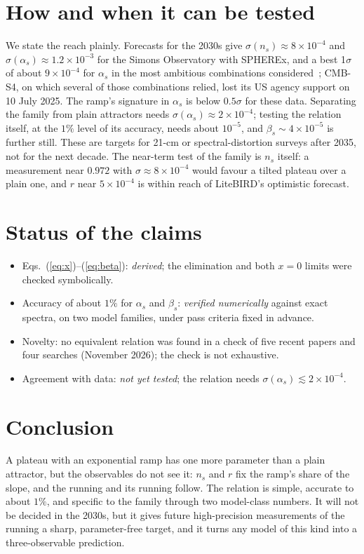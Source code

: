\documentclass[aps,prd,twocolumn,superscriptaddress,nofootinbib,showkeys]{revtex4-2}
\begin{document}
\section{How and when it can be tested}
We state the reach plainly. Forecasts for the 2030s give $\sigma(n_s)\approx8\times10^{-4}$ and $\sigma(\alpha_s)\approx1.2\times10^{-3}$ for the Simons Observatory with SPHEREx, and a best 1$\sigma$ of about $9\times10^{-4}$ for $\alpha_s$ in the most ambitious combinations considered~\cite{P2030}; CMB-S4, on which several of those combinations relied, lost its US agency support on 10 July 2025. The ramp's signature in $\alpha_s$ is below $0.5\sigma$ for these data. Separating the family from plain attractors needs $\sigma(\alpha_s)\approx2\times10^{-4}$; testing the relation itself, at the $1\%$ level of its accuracy, needs about $10^{-5}$, and $\beta_s\sim4\times10^{-5}$ is further still. These are targets for 21-cm or spectral-distortion surveys after 2035, not for the next decade. The near-term test of the family is $n_s$ itself: a measurement near $0.972$ with $\sigma\approx8\times10^{-4}$ would favour a tilted plateau over a plain one, and $r$ near $5\times10^{-4}$ is within reach of LiteBIRD's optimistic forecast.

\section{Status of the claims}
\begin{itemize}
\item Eqs.~(\ref{eq:x})--(\ref{eq:beta}): \emph{derived}; the elimination and both $x=0$ limits were checked symbolically.
\item Accuracy of about $1\%$ for $\alpha_s$ and $\beta_s$: \emph{verified numerically} against exact spectra, on two model families, under pass criteria fixed in advance.
\item Novelty: no equivalent relation was found in a check of five recent papers and four searches (November 2026); the check is not exhaustive.
\item Agreement with data: \emph{not yet tested}; the relation needs $\sigma(\alpha_s)\lesssim2\times10^{-4}$.
\end{itemize}

\section{Conclusion}
A plateau with an exponential ramp has one more parameter than a plain attractor, but the observables do not see it: $n_s$ and $r$ fix the ramp's share of the slope, and the running and its running follow. The relation is simple, accurate to about $1\%$, and specific to the family through two model-class numbers. It will not be decided in the 2030s, but it gives future high-precision measurements of the running a sharp, parameter-free target, and it turns any model of this kind into a three-observable prediction.
\end{document}
